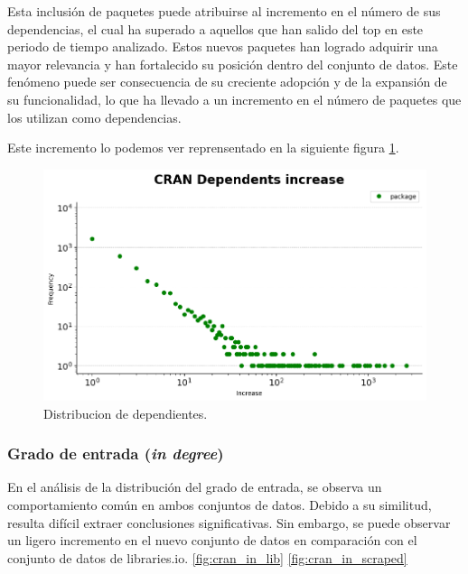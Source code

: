 Esta inclusión de paquetes puede atribuirse al incremento en el número de sus dependencias,
el cual ha superado a aquellos que han salido del top en este periodo de tiempo analizado.
Estos nuevos paquetes han logrado adquirir una mayor relevancia y han fortalecido su posición
dentro del conjunto de datos. Este fenómeno puede ser consecuencia de su creciente adopción y
de la expansión de su funcionalidad, lo que ha llevado a un incremento en el número de paquetes
que los utilizan como dependencias.

Este incremento lo podemos ver reprensentado en la siguiente figura \ref{fig:cran_dependents_dist}.

\begin{figure}[h!]
    \begin{center}
        \includegraphics[width=1\textwidth]{img/cran/dependents_dist.png}
        \caption{Distribucion de dependientes.}
        \label{fig:cran_dependents_dist}
    \end{center}
\end{figure}

\subsubsection{Grado de entrada (\textit{in degree})}


En el análisis de la distribución del grado de entrada, se observa un comportamiento común
en ambos conjuntos de datos. Debido a su similitud, resulta difícil extraer conclusiones
significativas. Sin embargo, se puede observar un ligero incremento en el nuevo conjunto de
datos en comparación con el conjunto de datos de libraries.io. \ref{fig:cran_in_lib} \ref{fig:cran_in_scraped}

